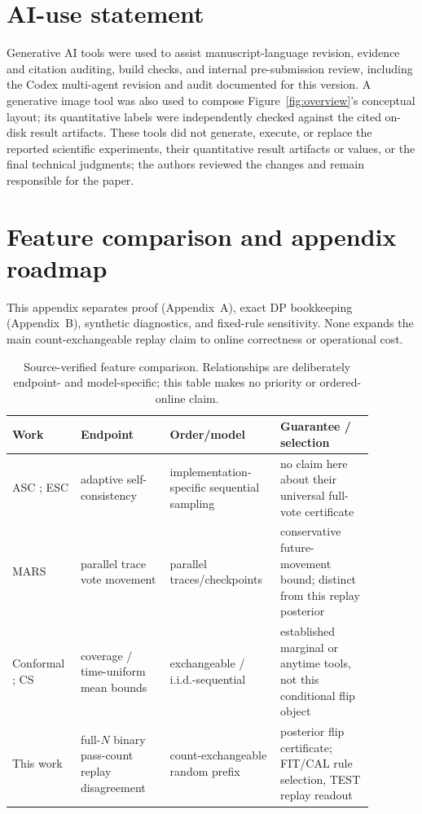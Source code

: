 \documentclass{article}
\theoremstyle{definition}
\theoremstyle{remark}
\begin{document}
\section*{AI-use statement}
Generative AI tools were used to assist manuscript-language revision,
evidence and citation auditing, build checks, and internal pre-submission
review, including the Codex multi-agent revision and audit documented for this
version. A generative image tool was also used to compose Figure~\ref{fig:overview}'s
conceptual layout; its quantitative labels were independently checked against
the cited on-disk result artifacts. These tools did not generate, execute, or
replace the reported scientific experiments, their quantitative result
artifacts or values, or the final technical judgments; the authors reviewed
the changes and remain responsible for the paper.




\appendix




\section{Feature comparison and appendix roadmap}
\label{app:positioning}
This appendix separates proof (Appendix~A), exact DP bookkeeping (Appendix~B),
synthetic diagnostics, and fixed-rule sensitivity. None expands the main
count-exchangeable replay claim to online correctness or operational cost.
\begin{table}[h]
\centering\footnotesize\setlength{\tabcolsep}{3pt}
\begin{tabular}{p{0.17\linewidth}p{0.23\linewidth}p{0.24\linewidth}p{0.24\linewidth}}
\toprule
Work & Endpoint & Order/model & Guarantee / selection \\
\midrule
ASC \citep{aggarwal2023asc}; ESC \citep{li2024esc} & adaptive self-consistency & implementation-specific sequential sampling & no claim here about their universal full-vote certificate \\
MARS \citep{chen2026mars} & parallel trace vote movement & parallel traces/checkpoints & conservative future-movement bound; distinct from this replay posterior \\
Conformal \citep{vovk2005algorithmic}; CS \citep{howard2021cs} & coverage / time-uniform mean bounds & exchangeable / i.i.d.-sequential & established marginal or anytime tools, not this conditional flip object \\
This work & full-$N$ binary pass-count replay disagreement & count-exchangeable random prefix & posterior flip certificate; FIT/CAL rule selection, TEST replay readout \\
\bottomrule
\end{tabular}
\caption{Source-verified feature comparison. Relationships are deliberately
endpoint- and model-specific; this table makes no priority or ordered-online claim.}
\label{tab:feature-compare}
\end{table}
\end{document}
